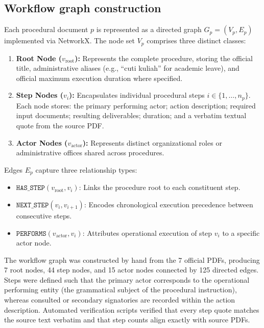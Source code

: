 \documentclass[preprint,10pt]{elsarticle}
\begin{document}
\subsection{Workflow graph construction}
\label{sec:graph}
Each procedural document $p$ is represented as a directed graph $G_p = (V_p, E_p)$ implemented via NetworkX. The node set $V_p$ comprises three distinct classes:
\begin{enumerate}[leftmargin=*]
\item \textbf{Root Node ($v_{\text{root}}$):} Represents the complete procedure, storing the official title, administrative aliases (e.g., ``cuti kuliah'' for academic leave), and official maximum execution duration where specified.
\item \textbf{Step Nodes ($v_i$):} Encapsulates individual procedural steps $i \in \{1, \dots, n_p\}$. Each node stores: the primary performing actor; action description; required input documents; resulting deliverables; duration; and a verbatim textual quote from the source PDF.
\item \textbf{Actor Nodes ($v_{\text{actor}}$):} Represents distinct organizational roles or administrative offices shared across procedures.
\end{enumerate}

Edges $E_p$ capture three relationship types:
\begin{itemize}[leftmargin=*]
\item $\texttt{HAS\_STEP}(v_{\text{root}}, v_i)$: Links the procedure root to each constituent step.
\item $\texttt{NEXT\_STEP}(v_i, v_{i+1})$: Encodes chronological execution precedence between consecutive steps.
\item $\texttt{PERFORMS}(v_{\text{actor}}, v_i)$: Attributes operational execution of step $v_i$ to a specific actor node.
\end{itemize}

The workflow graph was constructed by hand from the 7 official PDFs, producing 7 root nodes, 44 step nodes, and 15 actor nodes connected by 125 directed edges. Steps were defined such that the primary actor corresponds to the operational performing entity (the grammatical subject of the procedural instruction), whereas consulted or secondary signatories are recorded within the action description. Automated verification scripts verified that every step quote matches the source text verbatim and that step counts align exactly with source PDFs.
\end{document}
